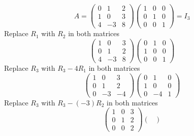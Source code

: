 \documentclass{article}
\begin{document}
\begin{homeworkProblem}
    \solution
    $$A = \begin{pmatrix}
            0 & 1  & 2 \\
            1 & 0  & 3 \\
            4 & -3 & 8
        \end{pmatrix}
        \begin{pmatrix}
            1 & 0 & 0 \\
            0 & 1 & 0 \\
            0 & 0 & 1
        \end{pmatrix} = I_3$$
    Replace $R_1$ with $R_2$ in both matrices
    $$\begin{pmatrix}
            1 & 0  & 3 \\
            0 & 1  & 2 \\
            4 & -3 & 8
        \end{pmatrix}
        \begin{pmatrix}
            0 & 1 & 0 \\
            1 & 0 & 0 \\
            0 & 0 & 1
        \end{pmatrix}$$
    Replace $R_3$ with $R_3 - 4R_1$ in both matrices
    $$\begin{pmatrix}
            1 & 0  & 3  \\
            0 & 1  & 2  \\
            0 & -3 & -4
        \end{pmatrix}
        \begin{pmatrix}
            0 & 1  & 0 \\
            1 & 0  & 0 \\
            0 & -4 & 1
        \end{pmatrix}$$
    Replace $R_3$ with $R_3 - (-3)R_2$ in both matrices
    $$\begin{pmatrix}
            1 & 0 & 3 \\
            0 & 1 & 2 \\
            0 & 0 & 2
        \end{pmatrix}
        \begin{pmatrix}

\end{pmatrix}$$
\end{homeworkProblem}
\end{document}
